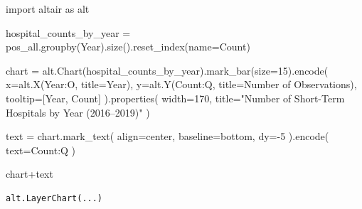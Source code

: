 \documentclass[
  letterpaper,
  DIV=11,
  numbers=noendperiod]{scrartcl}
\newenvironment{Shaded}{\begin{snugshade}}{\end{snugshade}}
\newcommand{\DecValTok}[1]{\textcolor[rgb]{0.68,0.00,0.00}{#1}}
\newcommand{\ImportTok}[1]{\textcolor[rgb]{0.00,0.46,0.62}{#1}}
\newcommand{\NormalTok}[1]{\textcolor[rgb]{0.00,0.23,0.31}{#1}}
\newcommand{\OperatorTok}[1]{\textcolor[rgb]{0.37,0.37,0.37}{#1}}
\newcommand{\StringTok}[1]{\textcolor[rgb]{0.13,0.47,0.30}{#1}}
\begin{document}
\begin{Shaded}
\begin{Highlighting}[]
\ImportTok{import}\NormalTok{ altair }\ImportTok{as}\NormalTok{ alt}

\NormalTok{hospital\_counts\_by\_year }\OperatorTok{=}\NormalTok{ pos\_all.groupby(}\StringTok{\textquotesingle{}Year\textquotesingle{}}\NormalTok{).size().reset\_index(name}\OperatorTok{=}\StringTok{\textquotesingle{}Count\textquotesingle{}}\NormalTok{)}

\NormalTok{chart }\OperatorTok{=}\NormalTok{ alt.Chart(hospital\_counts\_by\_year).mark\_bar(size}\OperatorTok{=}\DecValTok{15}\NormalTok{).encode(}
\NormalTok{    x}\OperatorTok{=}\NormalTok{alt.X(}\StringTok{\textquotesingle{}Year:O\textquotesingle{}}\NormalTok{, title}\OperatorTok{=}\StringTok{\textquotesingle{}Year\textquotesingle{}}\NormalTok{), }
\NormalTok{    y}\OperatorTok{=}\NormalTok{alt.Y(}\StringTok{\textquotesingle{}Count:Q\textquotesingle{}}\NormalTok{, title}\OperatorTok{=}\StringTok{\textquotesingle{}Number of Observations\textquotesingle{}}\NormalTok{), }
\NormalTok{    tooltip}\OperatorTok{=}\NormalTok{[}\StringTok{\textquotesingle{}Year\textquotesingle{}}\NormalTok{, }\StringTok{\textquotesingle{}Count\textquotesingle{}}\NormalTok{]  }
\NormalTok{).properties(}
\NormalTok{    width}\OperatorTok{=}\DecValTok{170}\NormalTok{,}
\NormalTok{    title}\OperatorTok{=}\StringTok{"Number of Short{-}Term Hospitals by Year (2016–2019)"}
\NormalTok{)}

\NormalTok{text }\OperatorTok{=}\NormalTok{ chart.mark\_text(}
\NormalTok{    align}\OperatorTok{=}\StringTok{\textquotesingle{}center\textquotesingle{}}\NormalTok{,}
\NormalTok{    baseline}\OperatorTok{=}\StringTok{\textquotesingle{}bottom\textquotesingle{}}\NormalTok{,}
\NormalTok{    dy}\OperatorTok{={-}}\DecValTok{5}  
\NormalTok{).encode(}
\NormalTok{    text}\OperatorTok{=}\StringTok{\textquotesingle{}Count:Q\textquotesingle{}}
\NormalTok{)}
  
\NormalTok{chart}\OperatorTok{+}\NormalTok{text}
\end{Highlighting}
\end{Shaded}

\begin{verbatim}
alt.LayerChart(...)
\end{verbatim}
\end{document}
